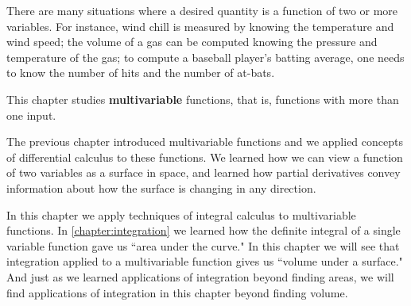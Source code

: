 There are many situations where a desired quantity is a function of two or more variables. For instance, wind chill is measured by knowing the temperature and wind speed; the volume of a gas can be computed knowing the pressure and temperature of the gas; to compute a baseball player's batting average, one needs to know the number of hits and the number of at-bats. 

This chapter studies \textbf{multivariable} functions, that is, functions with more than one input.













The previous chapter introduced multivariable functions and we applied concepts of differential calculus to these functions. We learned how we can view a function of two variables as a surface in space, and learned how partial derivatives convey  information about how the surface is changing in any direction.

In this chapter we apply techniques of integral calculus to multivariable functions. In \autoref{chapter:integration} we learned how the definite integral of a single variable function gave us ``area under the curve." In this chapter we will see that integration applied to a multivariable function gives us ``volume under a surface." And just as we learned applications of integration beyond finding areas, we will find applications of integration in this chapter beyond finding volume.








%

%
%
%
%
%
%
%










\cleardoublepage
